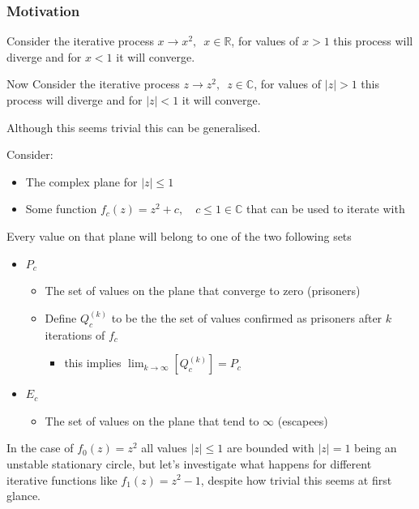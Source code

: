 \documentclass[11pt]{article}
\begin{document}
\subsubsection{Motivation}
\label{sec:org90ea49a}
Consider the iterative process \(x \rightarrow x^{2}, \enspace x \in \mathbb{R}\),
for values of \(x>1\) this process will diverge and for \(x<1\) it will converge.

Now Consider the iterative process \(z \rightarrow z^{2}, \enspace z \in \mathbb{C}\),
for values of \(\left\lvert z \right\rvert >1\) this process will diverge and for \(\left\lvert z \right\rvert <1\) it will converge.

Although this seems trivial this can be generalised.

Consider:

\begin{itemize}
\item The complex plane for \(\left\lvert z \right\rvert \leq 1\)
\item Some function \(f_{c}(z) = z^{2} + c, \quad c \leq 1 \in \mathbb{C}\) that can be used to iterate with
\end{itemize}

Every value on that plane will belong to one of the two following sets

\begin{itemize}
\item \(P_{c}\)
\begin{itemize}
\item The set of values on the plane that converge to zero (prisoners)
\item Define \(Q^{(k)}_{c}\) to be the the set of values confirmed as prisoners after \(k\) iterations of \(f_{c}\)
\begin{itemize}
\item this implies \(\lim_{k \rightarrow \infty} \left[ Q^{(k)}_{c}  \right] = P_{c}\)
\end{itemize}
\end{itemize}
\item \(E_{c}\)
\begin{itemize}
\item The set of values on the plane that tend to \(\infty\) (escapees)
\end{itemize}
\end{itemize}

In the case of \(f_{0}(z) = z^{2}\) all values \(\left\lvert z  \right \rvert \leq 1\) are bounded with \(\left\lvert z  \right \rvert = 1\) being an unstable stationary circle, but let's investigate what happens for different iterative functions like \(f_{1}(z) = z^{2} - 1\), despite how trivial this seems at first glance.
\end{document}
